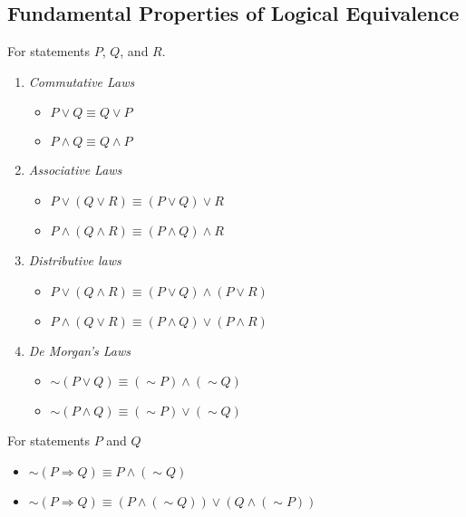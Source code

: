 \subsection{Fundamental Properties of Logical Equivalence}
\begin{thm}
    For statements $P$, $Q$, and $R$.
    \begin{enumerate}
         \item \emph{Commutative Laws}
         \begin{itemize}
              \item $P \vee Q \equiv Q \vee P$
              \item $P \wedge Q \equiv Q \wedge P$
         \end{itemize}
         \item \emph{Associative Laws}
         \begin{itemize}
              \item $P \vee (Q \vee R) \equiv (P \vee Q) \vee R$
              \item $P \wedge (Q \wedge R) \equiv (P \wedge Q) \wedge R$
         \end{itemize}
         \item \emph{Distributive laws}
         \begin{itemize}
              \item $P \vee (Q \wedge R) \equiv (P \vee Q) \wedge (P \vee R)$
              \item $P \wedge (Q \vee R) \equiv (P \wedge Q) \vee (P \wedge R)$
         \end{itemize}
         \item \emph{De Morgan's Laws}
         \begin{itemize}
            \item $\sim (P \vee Q) \equiv (\sim P) \wedge (\sim Q)$
            \item $\sim (P \wedge Q) \equiv (\sim P) \vee (\sim Q)$
         \end{itemize}
    \end{enumerate}
\end{thm}
\begin{thm}
    For statements $P$ and $Q$
    \begin{itemize}
       \item $\sim(P \Rightarrow Q) \equiv P \wedge (\sim Q)$
       \item $ \sim (P \Rightarrow Q) \equiv (P\wedge (\sim Q))\vee(Q\wedge (\sim P))$
    \end{itemize}
\end{thm}

